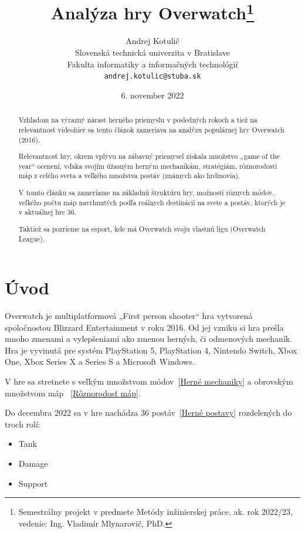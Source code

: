 \documentclass[10pt,oneside,slovak,a4paper]{article}
\title{Analýza hry Overwatch\thanks{Semestrálny projekt v predmete Metódy inžinierskej práce, ak. rok 2022/23, vedenie: Ing. Vladimír Mlynarovič, PhD.}} %
\author{Andrej Kotulič\\[2pt]
	{\small Slovenská technická univerzita v Bratislave}\\
	{\small Fakulta informatiky a informačných technológií}\\
	{\small \texttt{andrej.kotulic@stuba.sk}}
	}
\date{\small 6. november 2022} %
\begin{document}
\maketitle

\begin{abstract}
Vzhľadom na výrazný nárast herného priemyslu v posledných rokoch a tiež na relevantnosť videohier sa tento článok zameriava na analýzu populárnej hry Overwatch (2016). 

Relevantnosť hry, okrem vplyvu na zábavný priemysel získala množstvo „game of the year“ ocenení, vďaka svojím úžasným herným mechanikám, stratégiám, rôznorodosti máp z celého sveta a veľkého množstva postáv (známych ako hrdinovia).

V tomto článku sa zameriame na základnú štruktúru hry, možnosti rôznych módov, veľkého počtu máp navrhnutých podľa reálnych destinácií na svete a postáv, ktorých je v aktuálnej hre 36. 

Taktiež sa pozrieme na esport, kde má Overwatch svoju vlastnú ligu (Overwatch League).
\end{abstract}



\section{Úvod}

Overwatch je multiplatformová „First person shooter“ hra vytvorená spoločnostou Blizzard Entertainment  v roku 2016.
Od jej vzniku si hra prešla mnoho zmenami a vylepšeniami ako zmenou herných, či odmenových mechaník.
Hra je vyvinutá pre systém PlayStation 5, PlayStation 4, Nintendo Switch, Xbox One, Xbox Series X a Series S a Microsoft Windows.

V hre sa stretnete s veľkým množstvom módov~\ref{Herné mechaniky} a obrovským množstvom máp ~\ref{Rôznorodosť máp}.

Do decembra 2022 sa v hre nachádza 36 postáv~\ref{Herné postavy} rozdelených do troch rolí:
\begin{itemize}
\item Tank
\item Damage
\item Support
\end{itemize}
\end{document}
